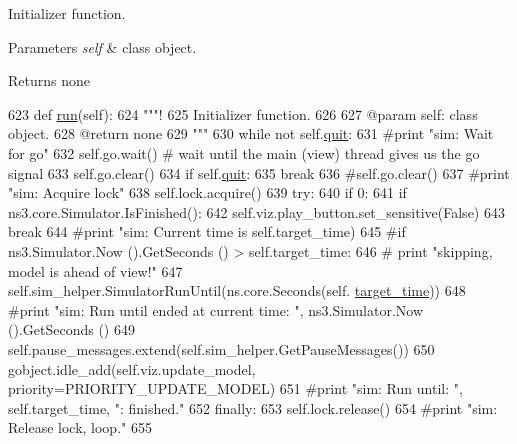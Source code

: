 Initializer function. 


\begin{DoxyParams}{Parameters}
{\em self} & class object. \\
\hline
\end{DoxyParams}
\begin{DoxyReturn}{Returns}
none 
\end{DoxyReturn}

\begin{DoxyCode}
623     \textcolor{keyword}{def }\hyperlink{classvisualizer_1_1core_1_1SimulationThread_a2fb28e4223f617bfe0587953a0792f63}{run}(self):
624         \textcolor{stringliteral}{"""!}
625 \textcolor{stringliteral}{        Initializer function.}
626 \textcolor{stringliteral}{}
627 \textcolor{stringliteral}{        @param self: class object.}
628 \textcolor{stringliteral}{        @return none}
629 \textcolor{stringliteral}{        """}
630         \textcolor{keywordflow}{while} \textcolor{keywordflow}{not} self.\hyperlink{classvisualizer_1_1core_1_1SimulationThread_a3d106bf935d132098c9fe3f909020819}{quit}:
631             \textcolor{comment}{#print "sim: Wait for go"}
632             self.go.wait() \textcolor{comment}{# wait until the main (view) thread gives us the go signal}
633             self.go.clear()
634             \textcolor{keywordflow}{if} self.\hyperlink{classvisualizer_1_1core_1_1SimulationThread_a3d106bf935d132098c9fe3f909020819}{quit}:
635                 \textcolor{keywordflow}{break}
636             \textcolor{comment}{#self.go.clear()}
637             \textcolor{comment}{#print "sim: Acquire lock"}
638             self.lock.acquire()
639             \textcolor{keywordflow}{try}:
640                 \textcolor{keywordflow}{if} 0:
641                     \textcolor{keywordflow}{if} ns3.core.Simulator.IsFinished():
642                         self.viz.play\_button.set\_sensitive(\textcolor{keyword}{False})
643                         \textcolor{keywordflow}{break}
644                 \textcolor{comment}{#print "sim: Current time is %
       self.target\_time)}
645                 \textcolor{comment}{#if ns3.Simulator.Now ().GetSeconds () > self.target\_time:}
646                 \textcolor{comment}{#    print "skipping, model is ahead of view!"}
647                 self.sim\_helper.SimulatorRunUntil(ns.core.Seconds(self.
      \hyperlink{classvisualizer_1_1core_1_1SimulationThread_a3625a411f9d892def63777fc1114967c}{target\_time}))
648                 \textcolor{comment}{#print "sim: Run until ended at current time: ", ns3.Simulator.Now ().GetSeconds ()}
649                 self.pause\_messages.extend(self.sim\_helper.GetPauseMessages())
650                 gobject.idle\_add(self.viz.update\_model, priority=PRIORITY\_UPDATE\_MODEL)
651                 \textcolor{comment}{#print "sim: Run until: ", self.target\_time, ": finished."}
652             \textcolor{keywordflow}{finally}:
653                 self.lock.release()
654             \textcolor{comment}{#print "sim: Release lock, loop."}
655 
\end{DoxyCode}
